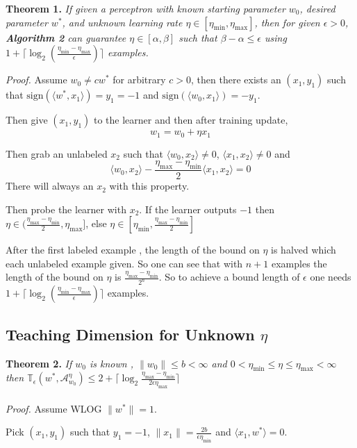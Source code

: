 \documentclass{article}
\newcommand{\learn}{\mathcal{A}_{w_0}^\eta}
\begin{document}
\textbf{Theorem 1.}
\textit{
If given a perceptron with known starting parameter $w_0$, desired parameter $w^*$, and unknown 
learning rate $\eta \in [\eta_{\min} , \eta_{\max}]$, then for given $\epsilon > 0$, \textbf{Algorithm 2} can guarantee $\eta \in 
[\alpha, \beta]$ such that $\beta - \alpha \leq \epsilon$ using $1 + \lceil \log_2(\frac{\eta_
{\min} - \eta_{\max}}{\epsilon})\rceil$ examples.}

\textit{Proof.}
Assume $w_0 \neq cw^*$ for arbitrary $c > 0$, then there exists an $(x_1, y_1)$ such that $\text{sign}(\langle w^*,x_1 \rangle) = y_1 = -1$ and $\text{sign}(\langle w_0,x_1 \rangle) = -y_1$.


Then give $(x_1, y_1)$ to the learner and then after training update,
$$
w_1 = w_0 + \eta x_1
$$

Then grab an unlabeled $x_2$ such that
$\langle w_0,x_2 \rangle \neq 0$, $\langle x_1, x_2 \rangle \neq 0$
and 
$$
\langle w_0,x_2 \rangle - \frac{\eta_{\max} - \eta_{\min}}{2} \langle x_1, x_2 \rangle = 0
$$
There will always an $x_2$ with this property.


Then probe the learner with $x_2$. If the learner outputs $-1$ then
$\eta \in (\frac{\eta_{\max} - \eta_{\min}}{2} , \eta_{\max}]$, else 
$\eta \in [\eta_{\min},\frac{\eta_{\max} - \eta_{\min}}{2}]$

After the first labeled example , the length of the bound on $\eta$ is halved which each unlabeled example given. So one can see that with $n + 1$ examples the length of the bound on $\eta$ is $\frac{\eta_{\max} - \eta_{\min}}{2 ^ n }$. So to achieve a bound length of $\epsilon$ one needs
$ 1 + \lceil \log_2 ( \frac{\eta_
{\min} - \eta_{\max}}{\epsilon} ) \rceil$ examples.

\subsection{Teaching Dimension for Unknown $\eta$}

\textbf{Theorem 2.}
\textit{ If $w_0$ is known , $\lVert w_0 \rVert \leq b < \infty$ and $ 0 < \eta_{\min} \leq \eta \leq \eta_{\max} < \infty$ 
then $\mathbb{T}_{\epsilon}(w^*, \learn)  \leq 2 + \lceil \log_2 \frac{\eta_{\max} - \eta_{\min}}{2\epsilon\eta_{\max}}  \rceil$
}
\\
\\
\textit{Proof.}
Assume WLOG $\lVert w^* \rVert = 1$.

Pick $(x_1,y_1)$ such that $y_1 = -1$, $\lVert x_1 \rVert = \frac{2 b}{\epsilon \eta_{\min}}$ and $\langle x_1 , w^* \rangle = 0$.
\end{document}
